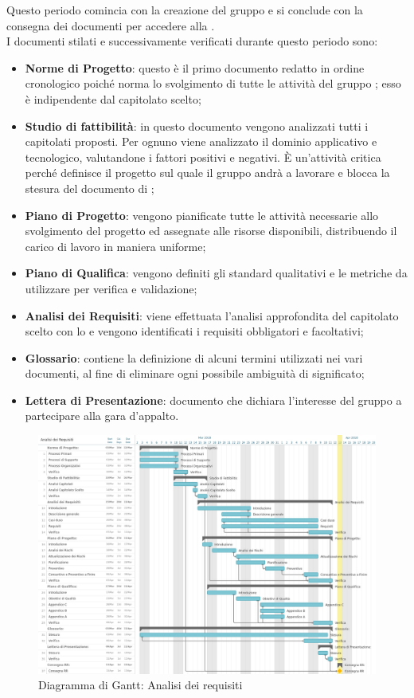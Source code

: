 Questo periodo comincia con la creazione del gruppo e si conclude con la consegna dei documenti per accedere alla \RR{}.\\
I documenti stilati e successivamente verificati durante questo periodo sono:
\begin{itemize}
\item \textbf{Norme di Progetto}: questo è il primo documento redatto in ordine cronologico poiché norma lo svolgimento di tutte le attività del gruppo \Gruppo{}; esso è indipendente dal capitolato scelto;
\item \textbf{Studio di fattibilità}: in questo documento vengono analizzati tutti i capitolati proposti. Per ognuno viene analizzato il dominio applicativo e tecnologico, valutandone i fattori positivi e negativi. È un’attività critica perché definisce il progetto sul quale il gruppo andrà a lavorare e blocca la stesura del documento di \AdR{};
\item \textbf{Piano di Progetto}: vengono pianificate tutte le attività necessarie allo svolgimento del progetto ed assegnate alle risorse disponibili, distribuendo il carico di lavoro in maniera uniforme;
\item \textbf{Piano di Qualifica}: vengono definiti gli standard qualitativi e le metriche da utilizzare per verifica e validazione;
\item \textbf{Analisi dei Requisiti}: viene effettuata l’analisi approfondita del capitolato scelto con lo \SdF{} e vengono identificati i requisiti obbligatori e facoltativi;
\item \textbf{Glossario}: contiene la definizione di alcuni termini utilizzati nei vari documenti, al fine di eliminare ogni possibile ambiguità di significato;
\item \textbf{Lettera di Presentazione}: documento che dichiara l’interesse del gruppo a partecipare alla gara d’appalto.
\end{itemize}

\begin{figure}[h!]
	\centerline{\includegraphics[scale=0.35]{img/DiagrammiGantt/AnalisiRequisiti.jpg}}
	\caption{Diagramma di Gantt: Analisi dei requisiti}
	\label{fig:gantt_ana_req}
\end{figure}
\clearpage

